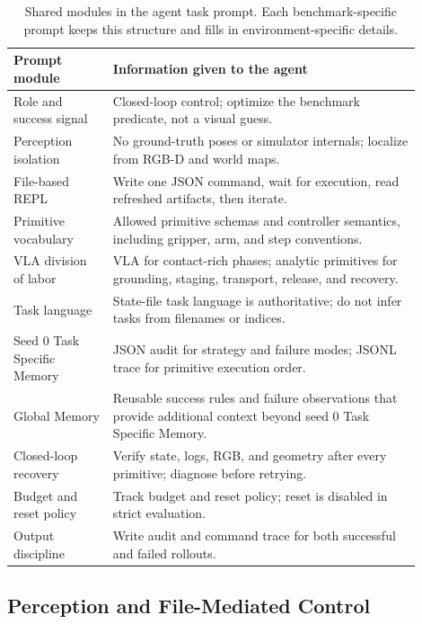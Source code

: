 \documentclass[11pt]{article}
\begin{document}
\begin{table}[h]
\centering
\caption{Shared modules in the agent task prompt. Each benchmark-specific prompt
keeps this structure and fills in environment-specific details.}
\label{tab:app_prompt_shared_modules}
\small
\setlength{\tabcolsep}{4pt}
\begin{tabular}{p{0.22\linewidth}p{0.68\linewidth}}
\toprule
Prompt module & Information given to the agent \\
\midrule
Role and success signal &
Closed-loop control; optimize the benchmark predicate, not a visual guess. \\
Perception isolation &
No ground-truth poses or simulator internals; localize from RGB-D and world maps. \\
File-based REPL &
Write one JSON command, wait for execution, read refreshed artifacts, then iterate. \\
Primitive vocabulary &
Allowed primitive schemas and controller semantics, including gripper, arm, and step
conventions. \\
VLA division of labor &
VLA for contact-rich phases; analytic primitives for grounding, staging, transport,
release, and recovery. \\
Task language &
State-file task language is authoritative; do not infer tasks from filenames or
indices. \\
Seed 0 Task Specific Memory &
JSON audit for strategy and failure modes; JSONL trace for primitive execution order. \\
Global Memory &
Reusable success rules and failure observations that provide additional context beyond
seed 0 Task Specific Memory. \\
Closed-loop recovery &
Verify state, logs, RGB, and geometry after every primitive; diagnose before retrying. \\
Budget and reset policy &
Track budget and reset policy; reset is disabled in strict evaluation. \\
Output discipline &
Write audit and command trace for both successful and failed rollouts. \\
\bottomrule
\end{tabular}
\end{table}

\subsection{Perception and File-Mediated Control}
\label{app:agent_prompt:perception}
\end{document}
